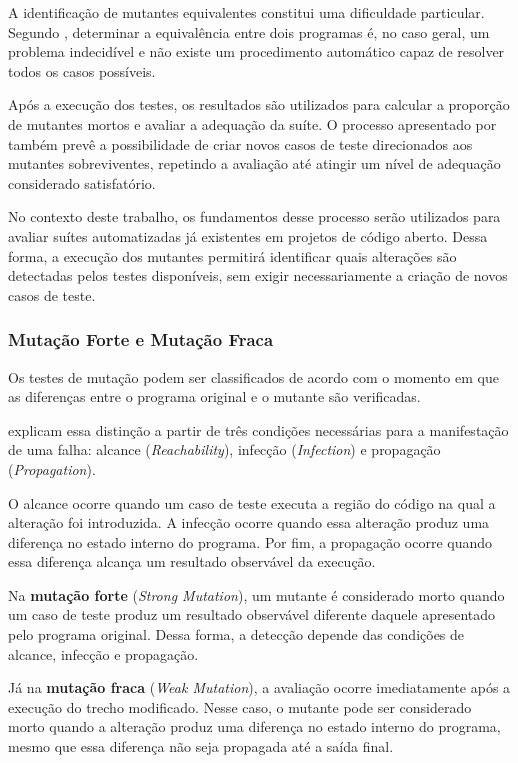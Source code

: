 A identificação de mutantes equivalentes constitui uma dificuldade particular. Segundo , determinar a equivalência entre dois programas é, no caso geral, um problema indecidível e  não existe um procedimento automático capaz de resolver todos os casos possíveis.

Após a execução dos testes, os resultados são utilizados para calcular a proporção de mutantes mortos e avaliar a adequação da suíte. O processo apresentado por  também prevê a possibilidade de criar novos casos de teste direcionados aos mutantes sobreviventes, repetindo a avaliação até atingir um nível de adequação considerado satisfatório.

No contexto deste trabalho, os fundamentos desse processo serão utilizados para avaliar suítes automatizadas já existentes em projetos de código aberto. Dessa forma, a execução dos mutantes permitirá identificar quais alterações são detectadas pelos testes disponíveis, sem exigir necessariamente a criação de novos casos de teste.

\subsubsection{Mutação Forte e Mutação Fraca}

Os testes de mutação podem ser classificados de acordo com o momento em que as diferenças entre o programa original e o mutante são verificadas.

 explicam essa distinção a partir de três condições necessárias para a manifestação de uma falha: alcance (\textit{Reachability}), infecção (\textit{Infection}) e propagação (\textit{Propagation}).

O alcance ocorre quando um caso de teste executa a região do código na qual a alteração foi introduzida. A infecção ocorre quando essa alteração produz uma diferença no estado interno do programa. Por fim, a propagação ocorre quando essa diferença alcança um resultado observável da execução.

Na \textbf{mutação forte} (\textit{Strong Mutation}), um mutante é considerado morto quando um caso de teste produz um resultado observável diferente daquele apresentado pelo programa original. Dessa forma, a detecção depende das condições de alcance, infecção e propagação.

Já na \textbf{mutação fraca} (\textit{Weak Mutation}), a avaliação ocorre imediatamente após a execução do trecho modificado. Nesse caso, o mutante pode ser considerado morto quando a alteração produz uma diferença no estado interno do programa, mesmo que essa diferença não seja propagada até a saída final.

